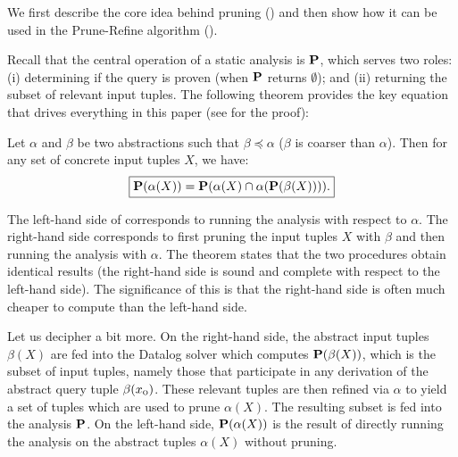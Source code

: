 
We first describe the core
idea behind pruning () and then show how it can be used in the
Prune-Refine algorithm ().


Recall that the central operation of a static analysis is $\mathbf{P}$, which serves two roles: (i)
determining if the query is proven (when $\mathbf{P}$ returns $\emptyset$); and (ii)
returning the subset of relevant input tuples.
The following theorem provides the key equation that drives everything in this paper (see  for the proof):

\begin{theorem}
\label{thm:master}
Let $\alpha$ and $\beta$ be two abstractions such that $\beta \preceq \alpha$
($\beta$ is coarser than $\alpha$).
Then for any set of concrete input tuples $X$, we have:
\begin{align}
\label{eqn:master}
\boxed{
\mathbf{P}(\alpha(X)) = \mathbf{P}(\alpha(X) \cap \alpha(\mathbf{P}(\beta(X)))).
}
\end{align}
\end{theorem}

The left-hand side of  corresponds to running the analysis with respect to $\alpha$.
The right-hand side corresponds to first pruning the input tuples $X$
with $\beta$ and then running the analysis with $\alpha$.
The theorem states that the two procedures obtain identical results
(the right-hand side is sound and complete with respect to the left-hand side).
The significance of this is that the right-hand side is often much cheaper
to compute than the left-hand side.

Let us decipher  a bit more.
On the right-hand side,
the abstract input tuples $\beta(X)$
are fed into the Datalog solver which computes $\mathbf{P}(\beta(X))$,
which is the subset of input tuples, namely those that participate in any derivation of the abstract query tuple $\beta(x_\text{\sc o})$.
These relevant tuples are then refined via $\alpha$ to yield a set of tuples which are used to prune $\alpha(X)$.
The resulting subset is fed into the analysis $\mathbf{P}$.
On the left-hand side, $\mathbf{P}(\alpha(X))$ is the result of directly running the analysis
on the abstract tuples $\alpha(X)$ without pruning.

